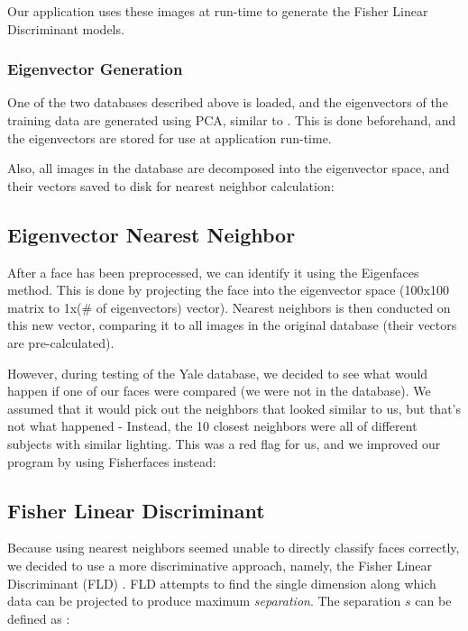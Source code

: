 Our application uses these images at run-time to generate the Fisher
Linear Discriminant models.

\subsubsection{Eigenvector Generation}

One of the two databases described above is loaded, and the
eigenvectors of the training data are generated using PCA, similar to
\cite{Eigenfaces}.  This is done beforehand, and the eigenvectors are
stored for use at application run-time.

Also, all images in the database are decomposed into the eigenvector
space, and their vectors saved to disk for nearest neighbor
calculation:

\subsection{Eigenvector Nearest Neighbor}

After a face has been preprocessed, we can identify it using the
Eigenfaces method.  This is done by projecting the face into the
eigenvector space (100x100 matrix to 1x(# of eigenvectors) vector).
Nearest neighbors is then conducted on this new vector, comparing it
to all images in the original database (their vectors are pre-calculated).

However, during testing of the Yale database, we decided to see what
would happen if one of our faces were compared (we were not in the
database).  We assumed that it would pick out the neighbors that
looked similar to us, but that's not what happened - Instead, the 10
closest neighbors were all of different subjects with similar
lighting.  This was a red flag for us, and we improved our program by
using Fisherfaces instead:

\subsection{Fisher Linear Discriminant}


Because using nearest neighbors seemed unable to directly classify
faces correctly, we decided to use a more discriminative approach,
namely, the Fisher Linear Discriminant (FLD) \cite{wikiFld}.  FLD
attempts to find the single dimension along which data can be
projected to produce maximum \emph{separation}.  The separation $s$
can be defined as \cite{wikiFld}:

